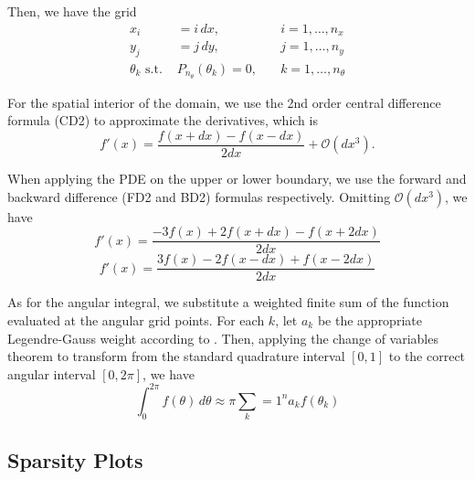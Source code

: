 \documentclass[10pt]{article}
\begin{document}
\begin{multicols}{2}
Then, we have the grid
\begin{align}
	x_i &= i\,dx, &\quad i=1,\ldots,n_x \\
	y_j &= j\,dy, &\quad j=1,\ldots,n_y \\
	\theta_k \,\, \mbox{s.t.}\,\, 
	&P_{n_\theta}(\theta_k) = 0, &\quad k=1,\ldots,n_\theta
\end{align}

For the spatial interior of the domain, we use the 2nd order central difference formula (CD2) to approximate the derivatives, which is
\begin{equation}
	\tag{CD2}
	f'(x) = \frac{f(x+dx)-f(x-dx)}{2dx} + \mathcal{O}(dx^3).
\end{equation}

When applying the PDE on the upper or lower boundary, we use the forward and backward difference (FD2 and BD2) formulas respectively.
Omitting $\mathcal{O}(dx^3)$, we have
\begin{equation}
	\tag{FD2}
	f'(x) = \frac{-3f(x)+2f(x+dx)-f(x+2dx)}{2dx}
\end{equation}
\begin{equation}
	\tag{BD2}
	f'(x) = \frac{3f(x)-2f(x-dx)+f(x-2dx)}{2dx}
\end{equation}

As for the angular integral, we substitute a weighted finite sum of the function evaluated at the angular grid points.
For each $k$, let $a_k$ be the appropriate Legendre-Gauss weight according to \citet[Chapter 2]{chandrasekhar_radiative_1960}.
Then, applying the change of variables theorem to transform from the standard quadrature interval $[0,1]$ to the correct angular interval $[0,2\pi]$, we have
\begin{equation}
	\tag{LG}
	\int_0^{2\pi} f(\theta)\,d\theta \approx \pi\sum_k=1^n a_k f(\theta_k)
\end{equation}

\subsection{Sparsity Plots}


\end{multicols}
\end{document}
